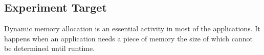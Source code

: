 


\subsection{Experiment Target}

Dynamic memory allocation is an essential activity in most of the applications. It happens when an application needs a piece of memory the size of which cannot be determined until runtime.


